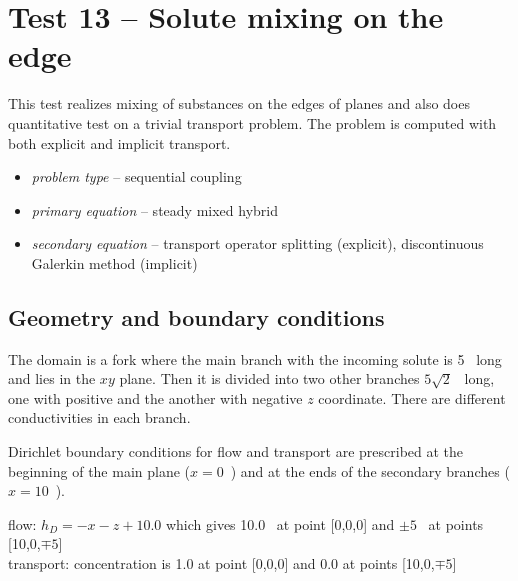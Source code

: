 
\section{Test 13 -- Solute mixing on the edge}
This test realizes mixing of substances on the edges of planes and also does quantitative test on a trivial 
transport problem. The problem is computed with both explicit and implicit transport.

\begin{itemize} 
    \item \emph{problem type} -- sequential coupling 
    \item \emph{primary equation} -- steady mixed hybrid
    \item \emph{secondary equation} -- transport operator splitting (explicit), discontinuous Galerkin method (implicit)
  \end{itemize}

\subsection*{Geometry and boundary conditions}
The domain is a fork where the main branch with the incoming solute is 5~ long and lies in 
the $xy$ plane. Then it is divided into two other branches $5\sqrt{2}$~ long, one with 
positive and the another with negative $z$ coordinate. There are different conductivities in each branch.

Dirichlet boundary conditions for flow and transport are prescribed at the beginning of the main 
plane ($x=0$~) and at the ends of the secondary branches ($x=10$~).

flow: $h_D=-x-z+10.0$ which gives 10.0~ at point [0,0,0] and $\pm5$~ at points [10,0,$\mp5$]\\
transport: concentration is 1.0 at point [0,0,0] and 0.0 at points [10,0,$\mp5$]

